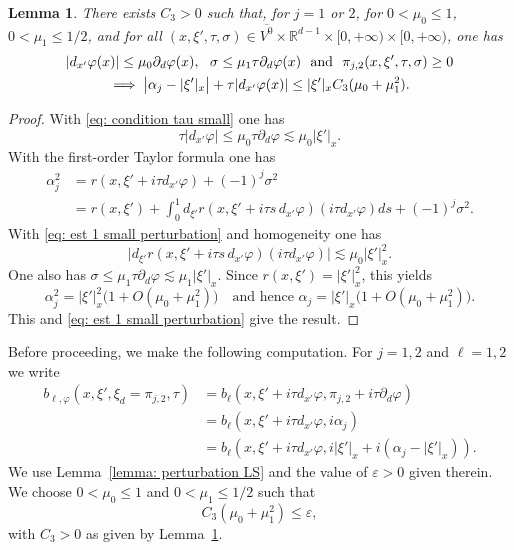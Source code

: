\documentclass[JEP,XML,SOM,Unicode,published]{cedram}
\theoremstyle{plain}
\newtheorem{lemma}[theorem]{Lemma}
\theoremstyle{definition}
\def\R{\mathbb{R}}
\let\eps\varepsilon
\let \Im \relax
\DeclareMathOperator{\Im}{Im}
\newcommand{\ovl}[1]{\overline{#1}}
\begin{document}
\begin{lemma}
\label{lemma: small perturbation}
There exists $C_3>0$ such that, for $j=1$ or $2$, for $0<\mu_0\leq
1$, $0< \mu_1\leq 1/2$, and for all
$(x, \xi', \tau, \sigma) \in
\ovl{V^0}\times\R^{d-1}\times[0,+\infty) \times[0,+\infty) $,
one has\vspace*{-3pt}
\begin{multline*}
|d_{x'}\varphi(x)|\leq \mu_0\partial_d\varphi(x),
\ \ \sigma\leq \mu_1\tau \partial_d \varphi(x)
\ \ \text{and} \ \
\Im \pi_{j,2} (x,\xi',\tau,\sigma)\geq 0 \\
\implies
\big| \alpha_j-|\xi'|_x\big|+\tau|d_{x'}\varphi(x)|
\leq |\xi'|_x C_3 (\mu_0+\mu_1^2).
\end{multline*}
\end{lemma}
\begin{proof}
With \eqref{eq: condition tau small} one has\vspace*{-3pt}
\begin{equation}
\label{eq: est 1 small perturbation}
\tau|d_{x'}\varphi| \leq \mu_0 \tau \partial_d\varphi
\lesssim \mu_0 |\xi'|_x.
\end{equation}
With the first-order Taylor formula one has
\begin{align*}
\alpha_j^2 &= r(x,\xi'+i\tau d_{x'}\varphi)+(-1)^j\sigma^2\\
&= r(x,\xi')
+\int_{0}^1 d_{\xi'}r(x,\xi'+i \tau s\, d_{x'}\varphi)
(i \tau d_{x'}\varphi)ds
+(-1)^j\sigma^2.
\end{align*}
With \eqref{eq: est 1 small perturbation} and homogeneity one
has\vspace*{-3pt}
\begin{equation*}
\big|
d_{\xi'}r(x,\xi'+i \tau s\, d_{x'}\varphi) (i \tau d_{x'}\varphi)
\big|
\lesssim \mu_0 |\xi'|_x^2.
\end{equation*}
One also has $\sigma \leq \mu_1 \tau \partial_d\varphi
\lesssim \mu_1 |\xi'|_x$.
Since $r(x,\xi') = |\xi'|_x^2$, this yields
\[
\alpha_j^2 = |\xi'|_x^2 \big(1 + O (\mu_0 + \mu_1^2)\big)\quad\text{and hence }\alpha_j = |\xi'|_x \big(1 + O (\mu_0 + \mu_1^2)\big).
\]
This and
\eqref{eq: est 1 small perturbation} give the result.
\end{proof}

Before proceeding, we make the following computation. For $j=1,2$
and $\ell=1,2$ we write
\begin{equation}
\label{lop6}
\begin{split}
b_{\ell,\varphi} (x,\xi',\xi_d =\pi_{j,2},\tau)
&=b_\ell(x,\xi'+i\tau d_{x'}\varphi, \pi_{j,2}+i\tau\partial_d\varphi) \\
&= b_\ell(x,\xi'+i\tau d_{x'}\varphi, i\alpha_j)\\
&=b_\ell(x,\xi'+i\tau d_{x'}\varphi, i|\xi'|_x+i(\alpha_j-|\xi'|_x)).
\end{split}
\end{equation}
We use Lemma~\ref{lemma: perturbation LS} and the value of $\eps>0$
given therein.
We choose $0< \mu_0\leq 1$ and $0 < \mu_1 \leq 1/2$ such that
\begin{equation}
\label{eq: uniform condition mu0 mu1 small}
C_3 (\mu_0+\mu_1^2) \leq \eps,
\end{equation}
with $C_3>0$ as given by Lemma~\ref{lemma: small perturbation}.
\end{document}
